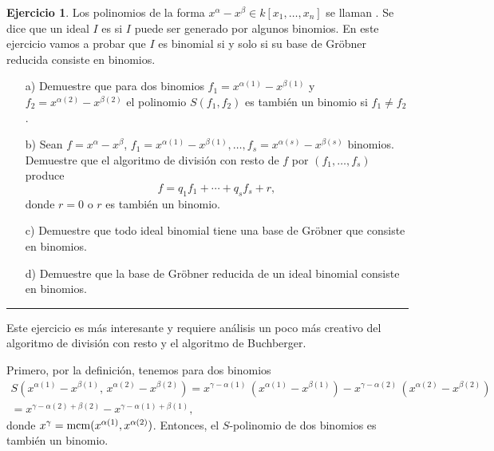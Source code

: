 \documentclass{article}
\theoremstyle{definition}
\newtheorem{ejerc}{Ejercicio}
\begin{document}
\newpage
\fi


\begin{ejerc}
  Los polinomios de la forma $x^\alpha - x^\beta \in k [x_1,\ldots,x_n]$ se
  llaman . Se dice que un ideal $I$ es  si $I$
  puede ser generado por algunos binomios. En este ejercicio vamos a probar que
  $I$ es binomial si y solo si su base de Gröbner reducida consiste en binomios.

  \begin{enumerate}
  \item[a)] Demuestre que para dos binomios $f_1 = x^{\alpha(1)} - x^{\beta(1)}$
    y $f_2 = x^{\alpha(2)} - x^{\beta(2)}$ el polinomio $S (f_1,f_2)$ es también
    un binomio si $f_1 \ne f_2$.

  \item[b)] Sean $f = x^\alpha - x^\beta$,
    $f_1 = x^{\alpha (1)} - x^{\beta (1)}, \ldots, f_s = x^{\alpha (s)} -
    x^{\beta (s)}$ binomios. Demuestre que el algoritmo de división con resto de
    $f$ por $(f_1,\ldots,f_s)$ produce
    $$f = q_1 f_1 + \cdots + q_s f_s + r,$$
    donde $r = 0$ o $r$ es también un binomio.


  \item[c)] Demuestre que todo ideal binomial tiene una base de Gröbner que
    consiste en binomios.

  \item[d)] Demuestre que la base de Gröbner reducida de un ideal binomial
    consiste en binomios.
  \end{enumerate}
\end{ejerc}

\ifdefined\solutions
\hrule
\vspace{1em}

Este ejercicio es más interesante y requiere análisis un poco más creativo del
algoritmo de división con resto y el algoritmo de Buchberger.

Primero, por la definición, tenemos para dos binomios
\begin{multline*}
  S (x^{\alpha (1)} - x^{\beta (1)}, \, x^{\alpha (2)} - x^{\beta (2)}) =
  x^{\gamma-\alpha(1)}\,(x^{\alpha (1)} - x^{\beta (1)}) - x^{\gamma-\alpha(2)}\,(x^{\alpha (2)} - x^{\beta (2)}) \\
  = x^{\gamma - \alpha (2) + \beta (2)} - x^{\gamma - \alpha (1) + \beta (1)},
\end{multline*}
donde $x^\gamma = \operatorname{mcm} (x^{\alpha(1)}, x^{\alpha(2)})$. Entonces,
el $S$-polinomio de dos binomios es también un binomio.
\end{document}

